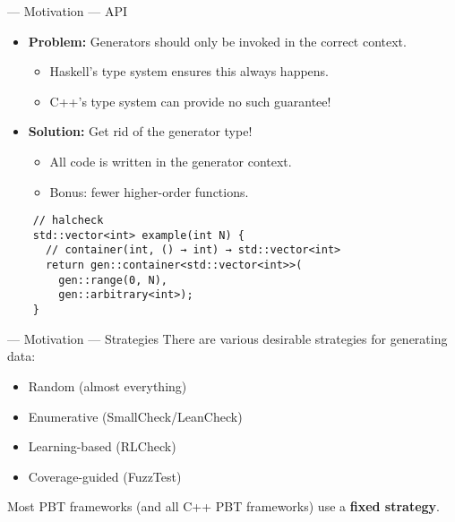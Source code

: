 \begin{frame}[fragile]{\halcheck{} --- Motivation --- API}
  \begin{itemize}
    \item \textbf{Problem:} Generators should only be invoked in the correct context.
          \begin{itemize}
            \item Haskell's type system ensures this always happens.
            \item C++'s type system can provide no such guarantee!
          \end{itemize}
          \pause{}
    \item \textbf{Solution:} Get rid of the generator type!
          \begin{itemize}
            \item All code is written in the generator context.
            \item Bonus: fewer higher-order functions.
          \end{itemize}
  \end{itemize}

  \begin{verbatim}
    // halcheck
    std::vector<int> example(int N) {
      // container(int, () → int) → std::vector<int>
      return gen::container<std::vector<int>>(
        gen::range(0, N),
        gen::arbitrary<int>);
    }
  \end{verbatim}
\end{frame}


\begin{frame}{\halcheck{} --- Motivation --- Strategies}
  There are various desirable strategies for generating data:
  \begin{itemize}
    \item Random (almost everything)
    \item Enumerative (SmallCheck/LeanCheck) \pause{}
    \item Learning-based (RLCheck)
    \item Coverage-guided (FuzzTest) \pause{}
  \end{itemize}

  Most PBT frameworks (and all C++ PBT frameworks) use a \textbf{fixed strategy}.
\end{frame}

